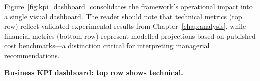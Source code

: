 
\noindent Figure~\ref{fig:kpi_dashboard} consolidates the framework's operational impact into a single visual dashboard. The reader should note that technical metrics (top row) reflect validated experimental results from Chapter~\ref{chap:analysis}, while financial metrics (bottom row) represent modelled projections based on published cost benchmarks---a distinction critical for interpreting managerial recommendations.



\noindent\textbf{Business KPI dashboard: top row shows technical.}

